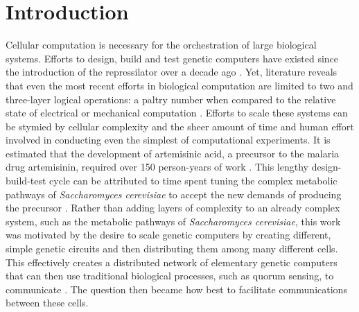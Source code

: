 \chapter{Introduction}
\label{chapter:Introduction}
\thispagestyle{myheadings}


Cellular computation is necessary for the orchestration of large biological systems. Efforts to design, build and test genetic computers have existed since the introduction of the repressilator over a decade ago \cite{elowitz2000}. Yet, literature reveals that even the most recent efforts in biological computation are limited to two and three-layer logical operations: a paltry number when compared to the relative state of electrical or mechanical computation \cite{nielsen2016genetic}. Efforts to scale these systems can be stymied by cellular complexity and the sheer amount of time and human effort involved in conducting even the simplest of computational experiments. It is estimated that the development of artemisinic acid, a precursor to the malaria drug artemisinin, required over 150 person-years of work \cite{kwok2010five}. This lengthy design-build-test cycle can be attributed to time spent tuning the complex metabolic pathways of \textit{Saccharomyces cerevisiae} to accept the new demands of producing the precursor \cite{artemisin}. Rather than adding layers of complexity to an already complex system, such as the metabolic pathways of \textit{Saccharomyces cerevisiae}, this work was motivated by the desire to scale genetic computers by creating different, simple genetic circuits and then distributing them among many different cells. This effectively creates a distributed network of elementary genetic computers that can then use traditional biological processes, such as quorum sensing, to communicate \cite{tamsir2011}. The question then became how best to facilitate communications between these cells. 

